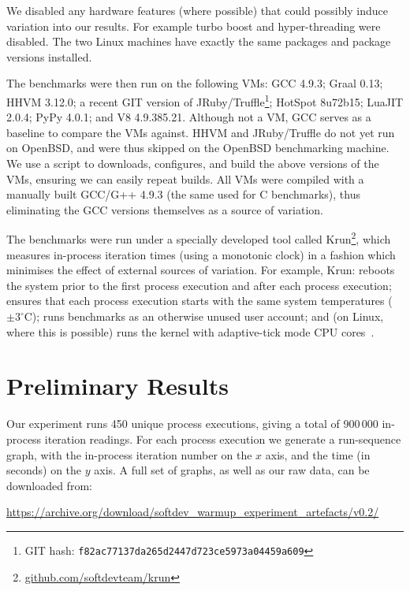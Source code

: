 \documentclass[preprint]{sigplanconf}
\newcommand{\krun}{Krun\xspace}
\begin{document}
\noindent We disabled any hardware features (where possible) that could
possibly induce variation into our results. For example turbo boost and
hyper-threading were disabled. The two Linux machines have exactly the same
packages and package versions installed.

The benchmarks were then run on the following VMs: GCC 4.9.3; Graal 0.13;
HHVM 3.12.0; a recent GIT version of JRuby/Truffle\footnote{GIT
hash: \texttt{f82ac77137da265d2447d723ce5973a04459a609}}; HotSpot 8u72b15;
LuaJIT 2.0.4; PyPy 4.0.1; and V8 4.9.385.21. Although not a VM, GCC serves as a
baseline to compare the VMs against. HHVM and JRuby/Truffle do not yet run on
OpenBSD, and were thus skipped on the OpenBSD benchmarking machine.
We use a script to downloads, configures, and build the above
versions of the VMs, ensuring we can easily repeat builds. All VMs were
compiled with a manually built GCC/G++ 4.9.3 (the same used for C benchmarks),
thus eliminating the GCC versions themselves as a source of variation.

The benchmarks were run under a specially developed tool called
\krun\footnote{\url{github.com/softdevteam/krun}}, which
measures in-process iteration times (using a monotonic clock) in a
fashion which minimises the effect of external sources of variation. For example,
\krun: reboots the system prior to the first process execution
and after each process execution; ensures that each process execution starts
with the same system temperatures ($\pm 3^\circ$C); runs benchmarks
as an otherwise unused user
account; and (on Linux, where this is possible) runs the kernel with
adaptive-tick mode CPU cores~\cite{tickless}.

\section{Preliminary Results}
\label{sec:Results}


Our experiment runs 450 unique process executions, giving a total of 900\,000
in-process iteration readings. For each process execution we generate a
run-sequence graph, with the in-process iteration number on the $x$ axis, and the
time (in seconds) on the $y$ axis. A full set of graphs, as well as our raw
data, can be downloaded from:
\vspace{-1em}
\begin{center}
{\small%
\url{https://archive.org/download/softdev_warmup_experiment_artefacts/v0.2/}
}
\end{center}
\end{document}
